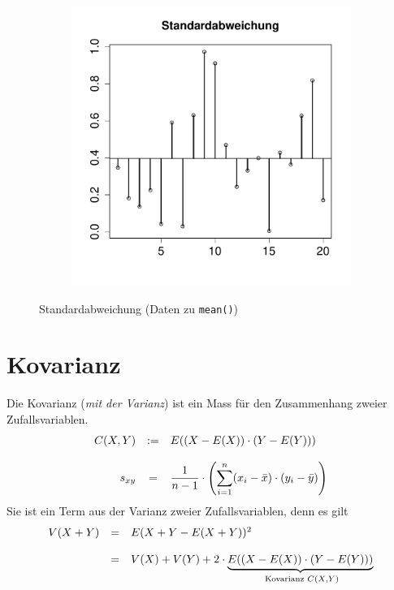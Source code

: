 \begin{figure}[h!]
\centering
\begin{subfigure}[b]{0.48\textwidth}
\includegraphics{begriffe-010}
\end{subfigure}
\caption{Standardabweichung (Daten zu \lstinline{mean()})}
\end{figure}

\section{Kovarianz}
Die Kovarianz (\emph{mit der Varianz}) ist ein Mass für den
Zusammenhang zweier Zufallsvariablen.
\[ \begin{array}{r c l} 
	C(X,Y) 
		&:= 
		& E((X-E(X)) \cdot (Y-E(Y))) \\
	& & \\
	s_{xy} 
		& = 
		& \displaystyle \frac{1}{n-1} \cdot \left( 
			\sum_{i=1}^n (x_i - \bar{x}) \cdot (y_i - \bar{y})
		\right)

\end{array} \]
Sie ist ein Term aus der Varianz zweier Zufallsvariablen,
denn es gilt
\[ \begin{array}{l c l} 
	V(X+Y) 
		& =
		& E(X + Y - E(X+Y))^2 \\
		& & \\
		& = 
		& V(X) + V(Y) + 2 \cdot \underbrace{
			E((X-E(X))\cdot(Y-E(Y)))}_{\text{
				Kovarianz } C(X,Y)}
\end{array} \]

